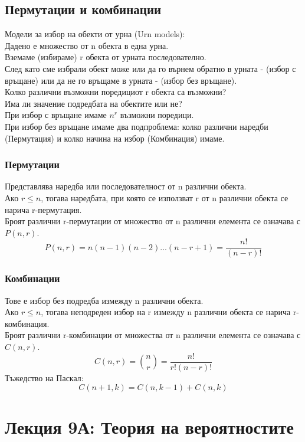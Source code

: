 \documentclass[fleqn, 12pt]{article}
\theoremstyle{definition}
\begin{document}
\subsection{Пермутации и комбинации}
Модели за избор на обекти от урна (Urn models):\\
Дадено е множество от n обекта в една урна.\\
Вземаме (избираме) r обекта от урната последователно. \\
След като сме избрали обект може или да го върнем обратно в урната - (избор с връщане) или да не го връщаме в урната - (избор без връщане).\\
Колко различни възможни поредициот r обекта са възможни?\\
Има ли значение подредбата на обектите или не?\\
При избор с връщане имаме $n^r$ възможни поредици.\\
При избор без връщане имаме два подпроблема: колко различни наредби (Пермутация) и колко начина на избор (Комбинация) имаме. 

\subsubsection{Пермутации}
Представлява наредба или последователност от n различни обекта.\\
Ако $r \leq n$, тогава наредбата, при която се използват r от n различни обекта се нарича r-пермутация.\\
Броят различни r-пермутации от множество от n различни елемента се означава с $P(n, r)$.
$$P(n,r) = n(n-1)(n-2)...(n-r + 1) = \frac{n!}{(n-r)!}$$

\subsubsection{Комбинации}
Тове е избор без подредба измежду n различни обекта.\\
Ако $r \leq n$, тогава  неподреден избор на r измежду n различни обекта се нарича r-комбинация.\\
Броят различни r-комбинации от множества от n различни елемента се означава с $C(n, r)$.
$$C(n,r) = \binom n r = \frac{n!}{r! (n-r)!} $$
Тъжедство на Паскал:
$$C(n+1,k) = C(n,k-1) + C(n,k) $$

\newpage
\section{Лекция 9А: Теория на вероятностите}
\end{document}
